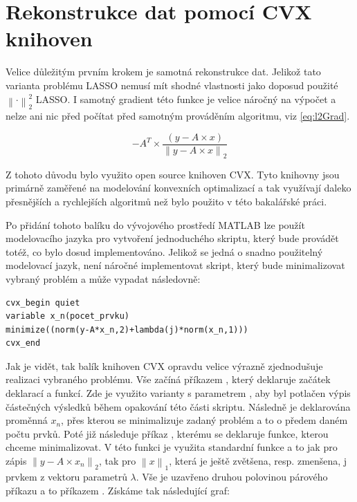 \documentclass[FM,BP]{tulthesis}
\newcounter{Vzorce}
\begin{document}
\section{Rekonstrukce dat pomocí CVX knihoven}
Velice důležitým prvním krokem je samotná rekonstrukce dat. Jelikož tato varianta problému LASSO nemusí mít shodné vlastnosti jako doposud použité $\left\| \cdot \right\|_{2}^{2} $ LASSO. I samotný gradient této funkce je velice náročný na výpočet a nelze ani nic před počítat před samotným prováděním algoritmu, viz \ref{eq:l2Grad}.

\begin{equation} \label{eq:l2Grad}  \tag{Vzorec \theVzorce}
-A^{T} \times \frac{\left(y-A \times x\right)}{\left\| y - A \times x\right\|_{2} }
\end{equation}

Z tohoto důvodu bylo využito open source knihoven CVX. Tyto knihovny jsou primárně zaměřené na modelování konvexních optimalizací a tak využívají daleko přesnějších a rychlejších algoritmů než bylo použito v této bakalářské práci. 

Po přidání tohoto balíku do vývojového prostředí MATLAB lze použít modelovacího jazyka pro vytvoření jednoduchého skriptu, který bude provádět totéž, co bylo dosud implementováno. Jelikož se jedná o snadno použitelný modelovací jazyk, není náročné implementovat skript, který bude minimalizovat vybraný problém a může vypadat následovně: 

\begin{lstlisting}
cvx_begin quiet
variable x_n(pocet_prvku)
minimize((norm(y-A*x_n,2)+lambda(j)*norm(x_n,1)))
cvx_end
\end{lstlisting}

Jak je vidět, tak balík knihoven CVX opravdu velice výrazně zjednodušuje realizaci vybraného problému. Vše začíná příkazem , který deklaruje začátek deklarací a funkcí. Zde je využito varianty s parametrem , aby byl potlačen výpis částečných výsledků během opakování této části skriptu. Následně je deklarována proměnná $x_n$, přes kterou se minimalizuje zadaný problém a to o předem daném počtu prvků. Poté již následuje příkaz , kterému se deklaruje funkce, kterou chceme minimalizovat. V této funkci je využita standardní funkce  a to jak pro zápis $\left\| y - A \times x_n\right\|_2$, tak pro $ \left\| x \right\|_1  $, která je ještě zvětšena, resp. zmenšena, j prvkem z vektoru parametrů $\lambda$. Vše je uzavřeno druhou polovinou párového příkazu a to příkazem . Získáme tak následující graf:
\end{document}
